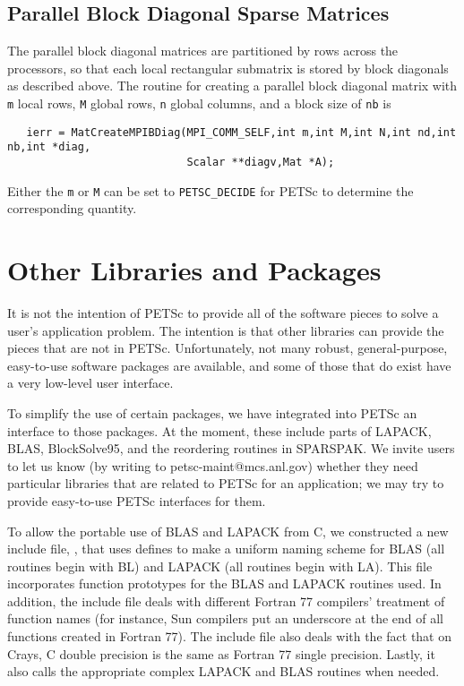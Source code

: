 \subsection{Parallel Block Diagonal Sparse Matrices}

The parallel block diagonal matrices are partitioned by rows across
the processors, so that each local rectangular submatrix is stored by
block diagonals as described above.  The routine for creating a
parallel block diagonal matrix with {\tt m} local rows, {\tt M} global
rows, {\tt n} global columns, and a block size of {\tt nb} is
\begin{verbatim}
   ierr = MatCreateMPIBDiag(MPI_COMM_SELF,int m,int M,int N,int nd,int nb,int *diag,
                            Scalar **diagv,Mat *A);
\end{verbatim}
Either the {\tt m} or {\tt M} can be set to {\tt PETSC\_DECIDE} for PETSc
to determine the corresponding quantity.

\section{Other Libraries and Packages}

It is not the intention of PETSc to provide all of the software pieces 
to solve a user's application problem. The intention is that other 
libraries can provide the pieces that are not in PETSc.  Unfortunately, 
not many robust, general-purpose, easy-to-use software packages 
are available, and some of those that do exist have a very low-level 
user interface. 

  
To simplify the use of certain packages, we have integrated
into PETSc an interface to those packages. At the moment, these include
parts of LAPACK, BLAS, BlockSolve95, and the reordering routines in 
SPARSPAK.  We invite users to let us know (by writing to petsc-maint@mcs.anl.gov)
whether they need particular libraries that 
are related to PETSc for an application; we may try to provide 
easy-to-use PETSc interfaces for them.

To allow the portable use of BLAS and LAPACK from C, we constructed a
new include file, 
, that uses defines to make
a uniform naming scheme for BLAS (all routines begin with BL) and
LAPACK (all routines begin with LA). This file incorporates function
prototypes for the BLAS and LAPACK routines used. In addition, the
include file deals with different Fortran 77 compilers' treatment of
function names (for instance, Sun compilers put an underscore at the
end of all functions created in Fortran 77).  The include file also
deals with the fact that on Crays, C double precision is the same as
Fortran 77 single precision.  Lastly, it also calls the appropriate
complex LAPACK and BLAS routines when needed.

